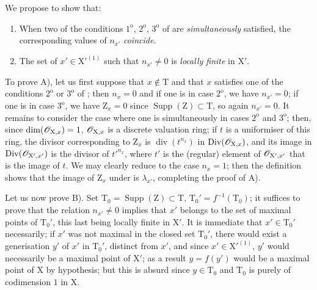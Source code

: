 \begin{env}[21.10.2]
\label{IV.21.10.2}
We propose to show that:
\begin{enumerate}[label=\Alph*)]
  \item When two of the conditions $1^{\mathrm{o}}$, $2^{\mathrm{o}}$, $3^{\mathrm{o}}$ of  are \emph{simultaneously} satisfied, the corresponding values of $n_{x'}$ \emph{coincide}.
  \item The set of $x'\in\mathrm{X}'^{(1)}$ such that $n_{x'}\neq 0$ is \emph{locally finite} in $\mathrm{X}'$.
\end{enumerate}

To prove A), let us first suppose that $x\notin\mathrm{T}$ and that $x$ satisfies one of the conditions $2^{\mathrm{o}}$ or $3^{\mathrm{o}}$ of ; then $n_x=0$ and if one is in case $2^{\mathrm{o}}$, we have $n_{x'}=0$; if one is in case $3^{\mathrm{o}}$, we have $\mathrm{Z}_x=0$ since $\operatorname{Supp}(\mathrm{Z})\subset\mathrm{T}$, so again $n_{x'}=0$.
It remains to consider the case where one is simultaneously in cases $2^{\mathrm{o}}$ and $3^{\mathrm{o}}$; then, since $\dim(\mathscr{O}_{\mathrm{X},x})=1$, $\mathscr{O}_{\mathrm{X},x}$ is a discrete valuation ring; if $t$ is a uniformiser of this ring, the divisor corresponding to $\mathrm{Z}_x$ is $\operatorname{div}(t^{n_x})$ in $\operatorname{Div}(\mathscr{O}_{\mathrm{X},x})$, and its image in $\operatorname{Div}(\mathscr{O}_{\mathrm{X}',x'})$ is the divisor of $t'^{n_x}$, where $t'$ is the (regular) element of $\mathscr{O}_{\mathrm{X}',x'}$ that is the image of $t$.
We may clearly reduce to the case $n_x=1$; then the definition  shows that the image of $\mathrm{Z}_x$ under  is $\lambda_{x'}$, completing the proof of A).

Let us now prove B).
Set $\mathrm{T}_0=\operatorname{Supp}(\mathrm{Z})\subset\mathrm{T}$, $\mathrm{T}_0'=f^{-1}(\mathrm{T}_0)$; it suffices to prove that the relation $n_{x'}\neq 0$ implies that $x'$ belongs to the set of maximal points of $\mathrm{T}_0'$, this last being locally finite in $\mathrm{X}'$.
It is immediate that $x'\in\mathrm{T}_0'$ necessarily; if $x'$ was not maximal in the closed set $\mathrm{T}_0'$, there would exist
a generisation $y'$ of $x'$ in $\mathrm{T}_0'$, distinct from $x'$, and since $x'\in\mathrm{X}'^{(1)}$, $y'$ would necessarily be a maximal point of $\mathrm{X}'$; as a result $y=f(y')$ would be a maximal point of $\mathrm{X}$ by hypothesis; but this is absurd since $y\in\mathrm{T}_0$ and $\mathrm{T}_0$ is purely of codimension $1$ in $\mathrm{X}$.
\end{env}

